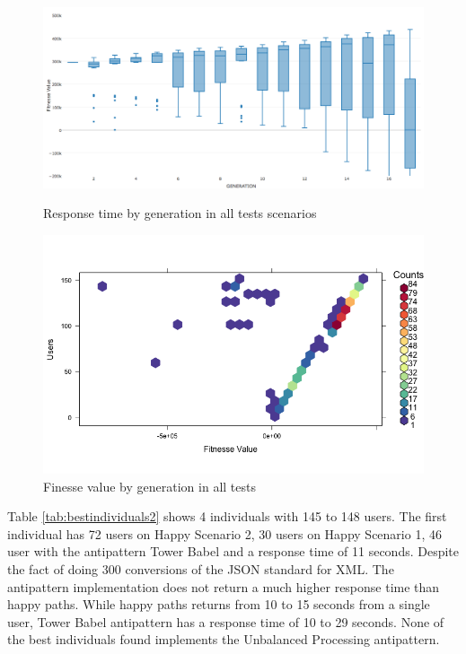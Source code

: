 \documentclass[times]{stvrauth}
\begin{document}
\begin{figure}[h]
\begin{minipage}{.5\textwidth}
\centering
\includegraphics[width=1\textwidth]{./images/experiment2-3.png}
\caption{Response time by generation in all tests scenarios}
\label{fig:summaryboxplot2}
\end{minipage}
\begin{minipage}{.5\textwidth}
\centering
\includegraphics[width=1\textwidth]{./images/experiment2-4.png}
\caption{Finesse value by generation in all tests}
\label{fig:density2}
\end{minipage}

\end{figure}

Table \ref{tab:bestindividuals2} shows 4 individuals with 145 to 148 users.  The first individual has 72 users on Happy Scenario 2, 30 users on Happy Scenario 1, 46 user with the antipattern Tower Babel and a response time of 11 seconds. Despite the fact of doing 300 conversions of the JSON standard for XML. The antipattern implementation does not return a much higher response time than happy paths. While happy paths returns from 10 to 15 seconds from a single user, Tower Babel antipattern has a response time of 10 to 29 seconds. None of the best individuals found implements the Unbalanced Processing antipattern.
\end{document}
